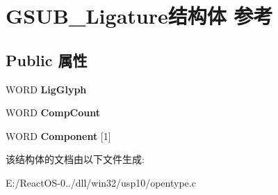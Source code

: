 \hypertarget{struct_g_s_u_b___ligature}{}\section{G\+S\+U\+B\+\_\+\+Ligature结构体 参考}
\label{struct_g_s_u_b___ligature}
\subsection*{Public 属性}
\begin{DoxyCompactItemize}
\item 
\mbox{\label{struct_g_s_u_b___ligature_a69970914a987d86d87fc55717d494dae}} 
W\+O\+RD {\bfseries Lig\+Glyph}
\item 
\mbox{\label{struct_g_s_u_b___ligature_a26876333269f6e4f164d616d41bd4e4e}} 
W\+O\+RD {\bfseries Comp\+Count}
\item 
\mbox{\label{struct_g_s_u_b___ligature_a14158ceda454ee0e30c080414173a815}} 
W\+O\+RD {\bfseries Component} \mbox{[}1\mbox{]}
\end{DoxyCompactItemize}


该结构体的文档由以下文件生成\+:\begin{DoxyCompactItemize}
\item 
E\+:/\+React\+O\+S-\/0../dll/win32/usp10/opentype.\+c\end{DoxyCompactItemize}
